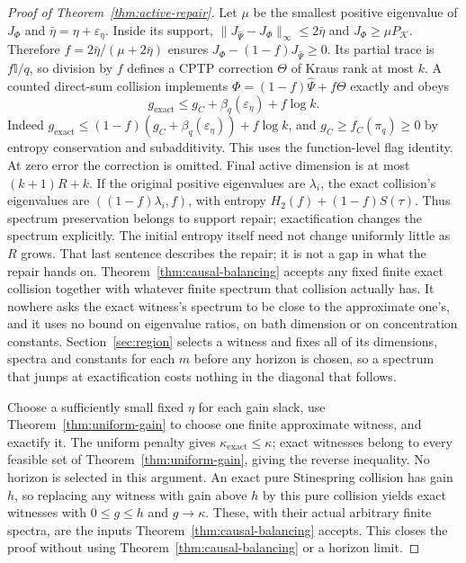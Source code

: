 \documentclass[11pt,a4paper]{article}
\numberwithin{equation}{section}
\theoremstyle{plain}
\theoremstyle{definition}
\newcommand{\one}{\mathbb{I}}
\newcommand{\kexact}{\kappa_{\mathrm{exact}}}
\begin{document}
\begin{proof}[Proof of Theorem~\ref{thm:active-repair}]
Let $\mu$ be the smallest positive eigenvalue of $J_\Phi$ and
$\bar\eta=\eta+\varepsilon_\eta$. Inside its support,
$\lVert J_{\hat\Psi}-J_\Phi\rVert_\infty\le 2\bar\eta$ and
$J_\Phi\ge\mu P_{\mathcal{K}}$. Therefore $f=2\bar\eta/(\mu+2\bar\eta)$
ensures $J_\Phi-(1-f)J_{\hat\Psi}\ge 0$. Its partial trace is $f\one/q$, so
division by $f$ defines a CPTP correction $\Theta$ of Kraus rank at most $k$.
A counted direct-sum collision implements $\Phi=(1-f)\hat\Psi+f\Theta$ exactly
and obeys
\begin{equation}
\label{eq:pointwise-flag}
g_{\mathrm{exact}}\le g_C+\beta_q(\varepsilon_\eta)+f\log k .
\end{equation}
Indeed $g_{\mathrm{exact}}\le(1-f)(g_C+\beta_q(\varepsilon_\eta))+f\log k$,
and $g_C\ge f_C(\pi_q)\ge 0$ by entropy conservation and subadditivity. This
uses the function-level flag identity. At zero error the correction is
omitted. Final active dimension is at most $(k+1)R+k$. If the original
positive eigenvalues are $\lambda_i$, the exact collision's eigenvalues are
$((1-f)\lambda_i,f)$, with entropy $H_2(f)+(1-f)S(\tau)$. Thus spectrum
preservation belongs to support repair; exactification changes the spectrum
explicitly. The initial entropy itself need not change uniformly little as $R$
grows. That last sentence describes the repair; it is not a gap in what the
repair hands on. Theorem~\ref{thm:causal-balancing} accepts any fixed finite
exact collision together with whatever finite spectrum that collision actually
has. It nowhere asks the exact witness's spectrum to be close to the
approximate one's, and it uses no bound on eigenvalue ratios, on bath
dimension or on concentration constants. Section~\ref{sec:region} selects a
witness and fixes all of its dimensions, spectra and constants for each $m$
before any horizon is chosen, so a spectrum that jumps at exactification costs
nothing in the diagonal that follows.

Choose a sufficiently small fixed $\eta$ for each gain slack, use
Theorem~\ref{thm:uniform-gain} to choose one finite approximate witness, and
exactify it. The uniform penalty gives $\kexact\le\kappa$; exact witnesses
belong to every feasible set of Theorem~\ref{thm:uniform-gain}, giving the
reverse inequality. No horizon is selected in this argument. An exact pure
Stinespring collision has gain $h$, so replacing any witness with gain above
$h$ by this pure collision yields exact witnesses with $0\le g\le h$ and
$g\to\kappa$. These, with their actual arbitrary finite spectra, are the
inputs Theorem~\ref{thm:causal-balancing} accepts. This closes the proof
without using Theorem~\ref{thm:causal-balancing} or a horizon limit.
\end{proof}
\end{document}
